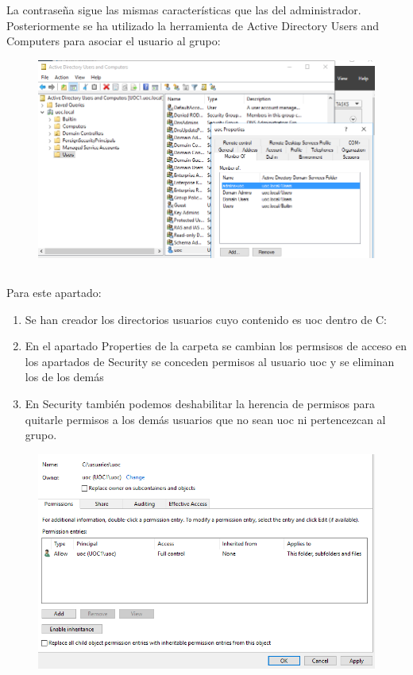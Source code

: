 \documentclass[10pt,a4paper]{article}
\begin{document}
La contraseña sigue las mismas características que las del administrador.\\
Posteriormente se ha utilizado la herramienta de Active Directory Users and Computers para asociar el usuario al grupo:
\begin{figure}
\centering
\includegraphics[scale=0.6]{users_and_computers.png}
\end{figure}

\subsection{}

Para este apartado:
\begin{enumerate}
\item Se han creador los directorios usuarios cuyo contenido es uoc dentro de C:
\item En el apartado Properties de la carpeta se cambian los permsisos de acceso en los apartados de Security se conceden permisos al usuario uoc y se eliminan los de los demás
\item En Security también podemos deshabilitar la herencia de permisos para quitarle permisos a los demás usuarios que no sean uoc ni pertencezcan al grupo.
\end{enumerate}
\begin{figure}[h!]
\centering
\includegraphics[scale=0.6]{fullcontrol.png}
\end{figure}
\end{document}
